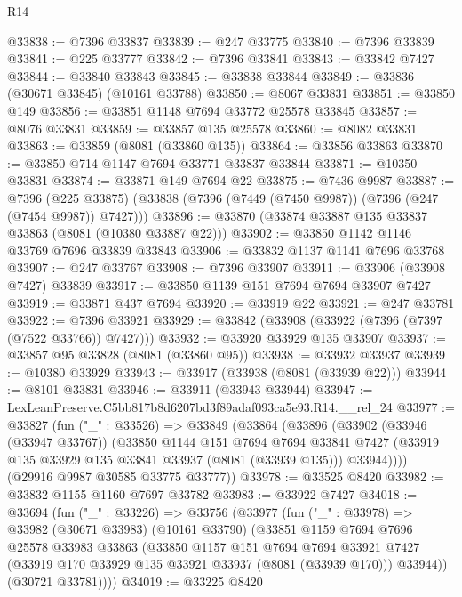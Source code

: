 \begin{lexlean}{R14}
\begin{coremodule}
@33838 := @7396 @33837
@33839 := @247 @33775
@33840 := @7396 @33839
@33841 := @225 @33777
@33842 := @7396 @33841
@33843 := @33842 @7427
@33844 := @33840 @33843
@33845 := @33838 @33844
@33849 := @33836 (@30671 @33845) (@10161 @33788)
@33850 := @8067 @33831
@33851 := @33850 @149
@33856 := @33851 @1148 @7694 @33772 @25578 @33845
@33857 := @8076 @33831
@33859 := @33857 @135 @25578
@33860 := @8082 @33831
@33863 := @33859 (@8081 (@33860 @135))
@33864 := @33856 @33863
@33870 := @33850 @714 @1147 @7694 @33771 @33837 @33844
@33871 := @10350 @33831
@33874 := @33871 @149 @7694 @22
@33875 := @7436 @9987
@33887 := @7396
    (@225 @33875)
    (@33838 (@7396 (@7449 (@7450 @9987)) (@7396 (@247 (@7454 @9987)) @7427)))
@33896 := @33870 (@33874 @33887 @135 @33837 @33863 (@8081 (@10380 @33887 @22)))
@33902 := @33850 @1142 @1146 @33769 @7696 @33839 @33843
@33906 := @33832 @1137 @1141 @7696 @33768
@33907 := @247 @33767
@33908 := @7396 @33907
@33911 := @33906 (@33908 @7427) @33839
@33917 := @33850 @1139 @151 @7694 @7694 @33907 @7427
@33919 := @33871 @437 @7694
@33920 := @33919 @22
@33921 := @247 @33781
@33922 := @7396 @33921
@33929 := @33842 (@33908 (@33922 (@7396 (@7397 (@7522 @33766)) @7427)))
@33932 := @33920 @33929 @135 @33907
@33937 := @33857 @95 @33828 (@8081 (@33860 @95))
@33938 := @33932 @33937
@33939 := @10380 @33929
@33943 := @33917 (@33938 (@8081 (@33939 @22)))
@33944 := @8101 @33831
@33946 := @33911 (@33943 @33944)
@33947 := LexLeanPreserve.C5bb817b8d6207bd3f89adaf093ca5e93.R14.__rel_24
@33977 := @33827
    (fun ("_" : @33526) =>
    @33849
      (@33864
        (@33896
          (@33902
            (@33946 (@33947 @33767))
            (@33850
              @1144
              @151
              @7694
              @7694
              @33841
              @7427
              (@33919 @135 @33929 @135 @33841 @33937 (@8081 (@33939 @135)))
              @33944))))
      (@29916 @9987 @30585 @33775 @33777))
@33978 := @33525 @8420
@33982 := @33832 @1155 @1160 @7697 @33782
@33983 := @33922 @7427
@34018 := @33694
    (fun ("_" : @33226) =>
    @33756
      (@33977
        (fun ("_" : @33978) =>
        @33982
          (@30671 @33983)
          (@10161 @33790)
          (@33851
            @1159
            @7694
            @7696
            @25578
            @33983
            @33863
            (@33850
              @1157
              @151
              @7694
              @7694
              @33921
              @7427
              (@33919 @170 @33929 @135 @33921 @33937 (@8081 (@33939 @170)))
              @33944))
          (@30721 @33781))))
@34019 := @33225 @8420

\end{coremodule}
\end{lexlean}
